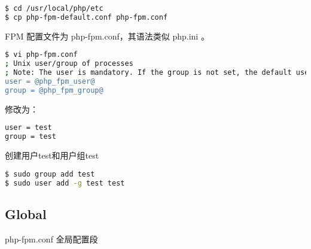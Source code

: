 \begin{lstlisting}[language=bash]
$ cd /usr/local/php/etc
$ cp php-fpm-default.conf php-fpm.conf
\end{lstlisting}

FPM 配置文件为 php-fpm.conf，其语法类似 php.ini 。


\begin{lstlisting}[language=bash]
$ vi php-fpm.conf
; Unix user/group of processes
; Note: The user is mandatory. If the group is not set, the default user's group will be used.
user = @php_fpm_user@
group = @php_fpm_group@
\end{lstlisting}

修改为：


\begin{lstlisting}[language=bash]
user = test
group = test
\end{lstlisting}

创建用户test和用户组test


\begin{lstlisting}[language=bash]
$ sudo group add test
$ sudo user add -g test test
\end{lstlisting}

\subsection{Global}

php-fpm.conf 全局配置段


